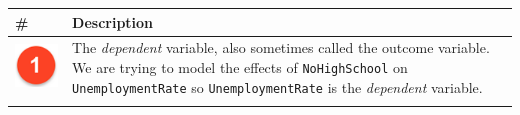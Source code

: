 \documentclass[]{article}
\theoremstyle{definition}
\theoremstyle{definition}
\theoremstyle{definition}
\theoremstyle{remark}
\begin{document}
\begin{longtable}[]{@{}ll@{}}
\toprule
\begin{minipage}[b]{0.08\columnwidth}\raggedright\strut
\#\strut
\end{minipage} & \begin{minipage}[b]{0.86\columnwidth}\raggedright\strut
Description\strut
\end{minipage}\tabularnewline
\midrule
\endhead
\begin{minipage}[t]{0.08\columnwidth}\raggedright\strut
\includegraphics[width=1.00000\textwidth]{./img/circle1.png}\strut
\end{minipage} & \begin{minipage}[t]{0.86\columnwidth}\raggedright\strut
The \emph{dependent} variable, also sometimes called the outcome
variable. We are trying to model the effects of \texttt{NoHighSchool} on
\texttt{UnemploymentRate} so \texttt{UnemploymentRate} is the
\emph{dependent} variable.\strut
\end{minipage}\tabularnewline
\begin{minipage}[t]{0.08\columnwidth}\raggedright\strut

\end{minipage}
\end{longtable}
\end{document}
